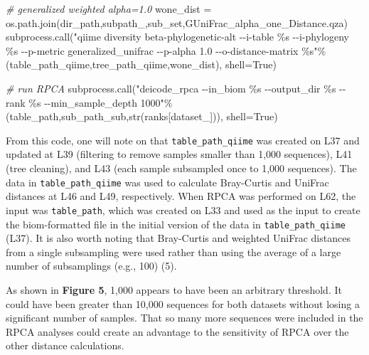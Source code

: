\documentclass[
]{article}
\newenvironment{Shaded}{}{}
\newcommand{\BuiltInTok}[1]{\textcolor[rgb]{0.65,0.15,0.64}{#1}}
\newcommand{\CommentTok}[1]{\textcolor[rgb]{0.63,0.63,0.65}{\textit{#1}}}
\newcommand{\NormalTok}[1]{\textcolor[rgb]{0.22,0.23,0.26}{#1}}
\newcommand{\OperatorTok}[1]{\textcolor[rgb]{0.65,0.15,0.64}{#1}}
\newcommand{\SpecialCharTok}[1]{\textcolor[rgb]{0.00,0.52,0.74}{#1}}
\newcommand{\StringTok}[1]{\textcolor[rgb]{0.31,0.63,0.31}{#1}}
\newcommand{\VariableTok}[1]{\textcolor[rgb]{0.89,0.34,0.29}{#1}}
\begin{document}
\begin{Shaded}
\begin{Highlighting}[numbers=left,,firstnumber=33,]
\CommentTok{\# generalized weighted alpha=1.0}
\NormalTok{wone\_dist }\OperatorTok{=}\NormalTok{ os.path.join(dir\_path,subpath\_,sub\_set,}\StringTok{\textquotesingle{}GUniFrac\_alpha\_one\_Distance.qza\textquotesingle{}}\NormalTok{)}
\NormalTok{subprocess.call(}\StringTok{"qiime diversity beta{-}phylogenetic{-}alt {-}{-}i{-}table }\SpecialCharTok{\%s}\StringTok{ {-}{-}i{-}phylogeny }\SpecialCharTok{\%s}\StringTok{ {-}{-}p{-}metric generalized\_unifrac {-}{-}p{-}alpha 1.0 {-}{-}o{-}distance{-}matrix }\SpecialCharTok{\%s}\StringTok{"}\OperatorTok{\%}\NormalTok{(table\_path\_qiime,tree\_path\_qiime,wone\_dist), shell}\OperatorTok{=}\VariableTok{True}\NormalTok{)           }
\end{Highlighting}
\end{Shaded}

\normalsize{}

\footnotesize

\begin{Shaded}
\begin{Highlighting}[numbers=left,,firstnumber=61,]
\CommentTok{\# run RPCA}
\NormalTok{subprocess.call(}\StringTok{"deicode\_rpca {-}{-}in\_biom }\SpecialCharTok{\%s}\StringTok{ {-}{-}output\_dir }\SpecialCharTok{\%s}\StringTok{ {-}{-}rank }\SpecialCharTok{\%s}\StringTok{ {-}{-}min\_sample\_depth 1000"}\OperatorTok{\%}\NormalTok{(table\_path,sub\_path\_sub,}\BuiltInTok{str}\NormalTok{(ranks[dataset\_])), shell}\OperatorTok{=}\VariableTok{True}\NormalTok{)                }
\end{Highlighting}
\end{Shaded}

\normalsize{}

From this code, one will note on that \texttt{table\_path\_qiime} was
created on L37 and updated at L39 (filtering to remove samples smaller
than 1,000 sequences), L41 (tree cleaning), and L43 (each sample
subsampled once to 1,000 sequences). The data in
\texttt{table\_path\_qiime} was used to calculate Bray-Curtis and
UniFrac distances at L46 and L49, respectively. When RPCA was performed
on L62, the input was \texttt{table\_path}, which was created on L33 and
used as the input to create the biom-formatted file in the initial
version of the data in \texttt{table\_path\_qiime} (L37). It is also
worth noting that Bray-Curtis and weighted UniFrac distances from a
single subsampling were used rather than using the average of a large
number of subsamplings (e.g., 100) (5).

As shown in \textbf{Figure 5}, 1,000 appears to have been an arbitrary
threshold. It could have been greater than 10,000 sequences for both
datasets without losing a significant number of samples. That so many
more sequences were included in the RPCA analyses could create an
advantage to the sensitivity of RPCA over the other distance
calculations.
\end{document}
